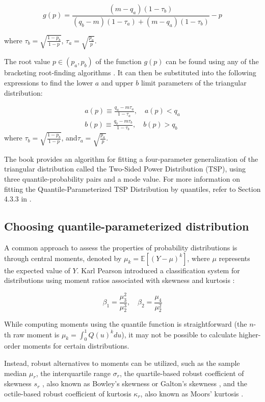 \documentclass[
  fleqn,
  deca,
  blindrev
]{informs4}
\begin{document}
\[
g(p)=\frac{(m-q_a)(1-\tau_b)}{(q_b-m)(1-\tau_a)+(m-q_a)(1-\tau_b)}-p
\]

where \(\tau_b=\sqrt{\frac{1-p_b}{1-p}}\),
\(\tau_a=\sqrt{\frac{p_a}{p}}\).

The root value \(p\in (p_a,p_b)\) of the function \(g(p)\) can be found
using any of the bracketing root-finding algorithms
\citep{perepolkin2023TenetsQuantilebasedInference}. It can then be
substituted into the following expressions to find the lower \(a\) and
upper \(b\) limit parameters of the triangular distribution:

\[
\begin{gathered}
a(p) \equiv \frac{q_a-m\tau_a}{1-\tau_a}, \quad a(p)<q_a\\
b(p) \equiv \frac{q_b-m\tau_b}{1-\tau_b}, \quad b(p)>q_b
\end{gathered}
\] where \(\tau_b=\sqrt{\frac{1-p_b}{1-p}}\),
and\(\tau_a=\sqrt{\frac{p_a}{p}}\).

The book \citep{kotz2004BetaOtherContinuous} provides an algorithm for
fitting a four-parameter generalization of the triangular distribution
called the Two-Sided Power Distribution (TSP), using three
quantile-probability pairs and a mode value. For more information on
fitting the Quantile-Parameterized TSP Distribution by quantiles, refer
to Section 4.3.3 in \citet{kotz2004BetaOtherContinuous}.

\subsection{Choosing quantile-parameterized
distribution}\label{sec-compareqf}

A common approach to assess the properties of probability distributions
is through central moments, denoted by \(\mu_k=\mathbb{E}[(Y-\mu)^k]\),
where \(\mu\) represents the expected value of \(Y\). Karl Pearson
introduced a classification system for distributions using moment ratios
associated with skewness and kurtosis
\citep{fiori2009KarlPearsonOrigin}:

\[
\beta_1=\frac{\mu_3^2}{\mu_2^3},\quad \beta_2=\frac{\mu_4}{\mu_2^2}
\]

While computing moments using the quantile function is straightforward
(the \(n\)-th raw moment is \(\mu_k=\int_0^1 Q(u)^k du\)), it may not be
possible to calculate higher-order moments for certain distributions.

Instead, robust alternatives to moments can be utilized, such as the
sample median \(\mu_r\), the interquartile range \(\sigma_r\), the
quartile-based robust coefficient of skewness \(s_r\)
\citep{kim2004MoreRobustEstimation}, also known as Bowley's skewness
\citep{bowley1920ElementsStatistics} or Galton's skewness
\citep{gilchrist2000StatisticalModellingQuantile}, and the octile-based
robust coefficient of kurtosis \(\kappa_r\), also known as Moors'
kurtosis \citep{moors1988QuantileAlternativeKurtosis}.
\end{document}
